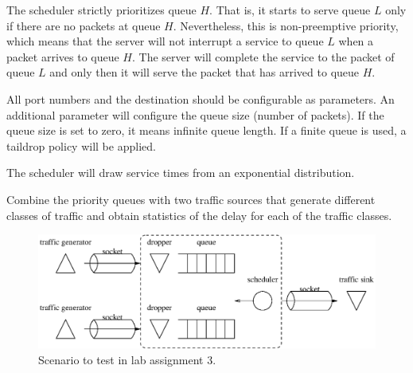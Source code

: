 The scheduler strictly prioritizes queue $H$.
That is, it starts to serve queue $L$ only if there are no packets at queue $H$.
Nevertheless, this is non-preemptive priority, which means that the server will not interrupt a service to queue $L$ when a packet arrives to queue $H$.
The server will complete the service to the packet of queue $L$ and only then it will serve the packet that has arrived to queue $H$.

All port numbers and the destination should be configurable as parameters. An additional parameter will configure the queue size (number of packets). If the queue size is set to zero, it means infinite queue length. If a finite queue is used, a taildrop policy will be applied.

The scheduler will draw service times from an exponential distribution.

Combine the priority queues with two traffic sources that generate different classes of traffic and obtain statistics of the delay for each of the traffic classes.

\begin{figure}[!h]
\centering
\includegraphics[width=\linewidth]{figures/scenario3.eps}
\caption{Scenario to test in lab assignment 3.}
\label{fig:scenario}
\end{figure}


